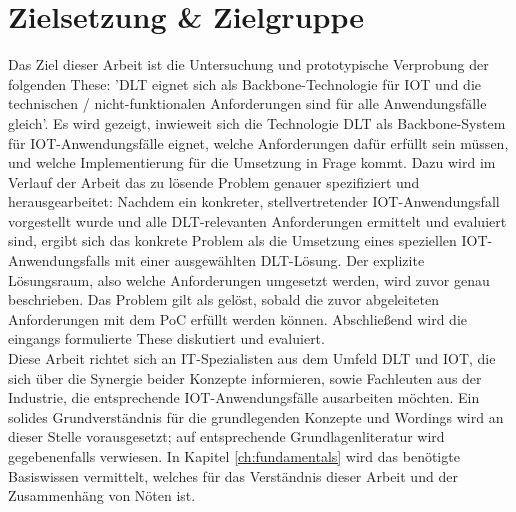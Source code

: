 \section{Zielsetzung \& Zielgruppe}
\label{sec:intro:goal}
Das Ziel dieser Arbeit ist die Untersuchung und prototypische Verprobung der folgenden These: '\ac{DLT} eignet sich als Backbone-Technologie für \ac{IOT} und die technischen / nicht-funktionalen Anforderungen sind für alle Anwendungsfälle gleich'. Es wird gezeigt, inwieweit sich die Technologie \ac{DLT} als Backbone-System für \ac{IOT}-Anwendungsfälle eignet, welche Anforderungen dafür erfüllt sein müssen, und welche Implementierung für die Umsetzung in Frage kommt. Dazu wird im Verlauf der Arbeit das zu lösende Problem genauer spezifiziert und herausgearbeitet: Nachdem ein konkreter, stellvertretender \ac{IOT}-Anwendungsfall vorgestellt wurde und alle \ac{DLT}-relevanten Anforderungen ermittelt und evaluiert sind, ergibt sich das konkrete Problem als die Umsetzung eines speziellen \ac{IOT}-Anwendungsfalls mit einer ausgewählten \ac{DLT}-Lösung. Der explizite Lösungsraum, also welche Anforderungen umgesetzt werden, wird zuvor genau beschrieben. Das Problem gilt als gelöst, sobald die zuvor abgeleiteten Anforderungen mit dem \ac{PoC} erfüllt werden können. Abschließend wird die eingangs formulierte These diskutiert und evaluiert.\\
Diese Arbeit richtet sich an IT-Spezialisten aus dem Umfeld \ac{DLT} und \ac{IOT}, die sich über die Synergie beider Konzepte informieren, sowie Fachleuten aus der Industrie, die entsprechende \ac{IOT}-Anwendungsfälle ausarbeiten möchten. Ein solides Grundverständnis für die grundlegenden Konzepte und Wordings wird an dieser Stelle vorausgesetzt; auf entsprechende Grundlagenliteratur wird gegebenenfalls verwiesen. In Kapitel \ref{ch:fundamentals} wird das benötigte Basiswissen vermittelt, welches für das Verständnis dieser Arbeit und der Zusammenhäng von Nöten ist.

%
%
